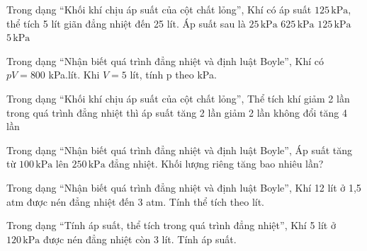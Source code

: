 \begin{ex}
Trong dạng “Khối khí chịu áp suất của cột chất lỏng”, Khí có áp suất $125\,\text{kPa}$, thể tích 5 lít giãn đẳng nhiệt đến 25 lít. Áp suất sau là
\choice
{\True $25\,\text{kPa}$}
{$625\,\text{kPa}$}
{$125\,\text{kPa}$}
{$5\,\text{kPa}$}
\end{ex}

\begin{ex}
Trong dạng “Nhận biết quá trình đẳng nhiệt và định luật Boyle”, Khí có $pV=800$ kPa.lít. Khi $V=5$ lít, tính p theo kPa.
\end{ex}

\begin{ex}
Trong dạng “Khối khí chịu áp suất của cột chất lỏng”, Thể tích khí giảm 2 lần trong quá trình đẳng nhiệt thì áp suất
\choice
{\True tăng 2 lần}
{giảm 2 lần}
{không đổi}
{tăng 4 lần}
\end{ex}

\begin{ex}
Trong dạng “Nhận biết quá trình đẳng nhiệt và định luật Boyle”, Áp suất tăng từ $100\,\text{kPa}$ lên $250\,\text{kPa}$ đẳng nhiệt. Khối lượng riêng tăng bao nhiêu lần?
\end{ex}

\begin{ex}
Trong dạng “Nhận biết quá trình đẳng nhiệt và định luật Boyle”, Khí 12 lít ở 1,5 atm được nén đẳng nhiệt đến 3 atm. Tính thể tích theo lít.
\end{ex}

\begin{bt}
Trong dạng “Tính áp suất, thể tích trong quá trình đẳng nhiệt”, Khí 5 lít ở $120\,\text{kPa}$ được nén đẳng nhiệt còn 3 lít. Tính áp suất.
\end{bt}

